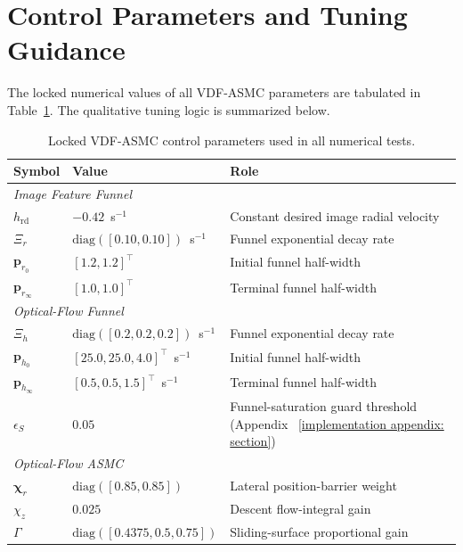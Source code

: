 \documentclass{IEEEtaes}
\begin{document}
\section{Control Parameters and Tuning Guidance} \label{tuning: section}
The locked numerical values of all VDF-ASMC parameters are tabulated in Table~\ref{sup:control params}. The qualitative tuning logic is summarized below.

\begin{table}[!t]
    \centering
    \footnotesize
    \caption{Locked VDF-ASMC control parameters used in all numerical tests.}
    \label{sup:control params}
    \begin{tabular}{p{} p{} p{}}
    \toprule
        \textbf{Symbol} & \textbf{Value} & \textbf{Role}\\
    \midrule
        \multicolumn{3}{l}{\textit{Image Feature Funnel}} \\
        $h_\text{rd}$ & $-0.42$~s$^{-1}$ & Constant desired image radial velocity \\
        $\Xi_r$                     & $\text{diag}([0.10,0.10])$~s$^{-1}$ & Funnel exponential decay rate \\
        $\boldsymbol{p}_{r_0}$      & $[1.2,1.2]^\top$ & Initial funnel half-width \\
        $\boldsymbol{p}_{r_\infty}$ & $[1.0,1.0]^\top$ & Terminal funnel half-width \\
    \midrule
        \multicolumn{3}{l}{\textit{Optical-Flow Funnel}} \\
        $\Xi_h$                     & $\text{diag}([0.2,0.2,0.2])$~s$^{-1}$ & Funnel exponential decay rate \\
        $\boldsymbol{p}_{h_0}$      & $[25.0,25.0,4.0]^\top$~s$^{-1}$ & Initial funnel half-width \\
        $\boldsymbol{p}_{h_\infty}$ & $[0.5,0.5,1.5]^\top$~s$^{-1}$ & Terminal funnel half-width \\
        $\epsilon_S$                & $0.05$ & Funnel-saturation guard threshold (Appendix~
\ref{implementation appendix: section}) \\
    \midrule
        \multicolumn{3}{l}{\textit{Optical-Flow ASMC}} \\
        $\boldsymbol{\chi}_r$   & $\text{diag}([0.85,0.85])$ & Lateral position-barrier weight \\
        $\chi_z$                & $0.025$ & Descent flow-integral gain \\
        $\Gamma$                & $\text{diag}([0.4375,0.5,0.75])$ & Sliding-surface proportional gain \\

\end{tabular}
\end{table}
\end{document}
